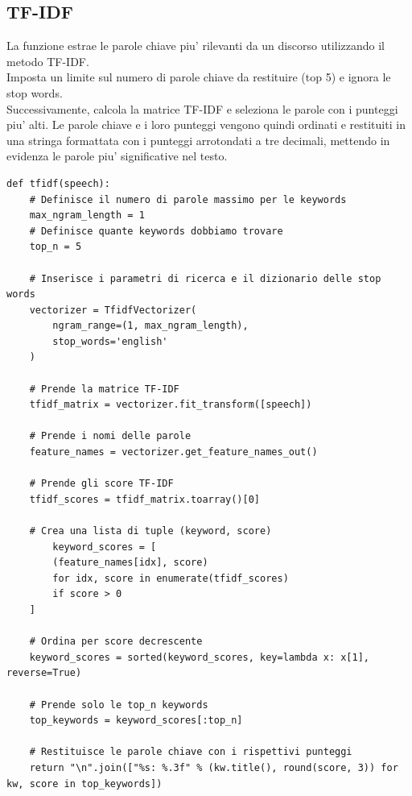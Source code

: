 \documentclass{article}
\begin{document}
			\subsection{TF-IDF}
La funzione estrae le parole chiave piu' rilevanti da un discorso utilizzando il metodo TF-IDF. \\ Imposta un limite sul numero di parole chiave da restituire (top 5) e ignora le stop words.\\ Successivamente, calcola la matrice TF-IDF e seleziona le parole con i punteggi piu' alti. Le parole chiave e i loro punteggi vengono quindi ordinati e restituiti in una stringa formattata con i punteggi arrotondati a tre decimali, mettendo in evidenza le parole piu' significative nel testo.	
	\begin{lstlisting}	
def tfidf(speech):
	# Definisce il numero di parole massimo per le keywords
	max_ngram_length = 1
	# Definisce quante keywords dobbiamo trovare
	top_n = 5

	# Inserisce i parametri di ricerca e il dizionario delle stop words
	vectorizer = TfidfVectorizer(
		ngram_range=(1, max_ngram_length),
		stop_words='english'
	)

	# Prende la matrice TF-IDF
	tfidf_matrix = vectorizer.fit_transform([speech])
	
	# Prende i nomi delle parole
	feature_names = vectorizer.get_feature_names_out()
	
	# Prende gli score TF-IDF
	tfidf_scores = tfidf_matrix.toarray()[0]

	# Crea una lista di tuple (keyword, score)
		keyword_scores = [
		(feature_names[idx], score)
		for idx, score in enumerate(tfidf_scores)
		if score > 0
	]

	# Ordina per score decrescente
	keyword_scores = sorted(keyword_scores, key=lambda x: x[1], reverse=True)
	
	# Prende solo le top_n keywords
	top_keywords = keyword_scores[:top_n]
	
	# Restituisce le parole chiave con i rispettivi punteggi
	return "\n".join(["%s: %.3f" % (kw.title(), round(score, 3)) for kw, score in top_keywords])

	\end{lstlisting}
\end{document}
